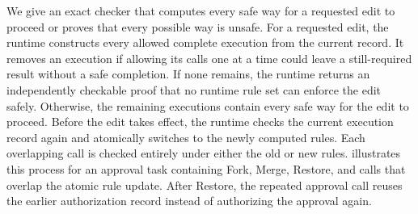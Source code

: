 We give an exact checker that computes every safe way for a requested edit to proceed or proves that every possible way is unsafe.
For a requested edit, the runtime constructs every allowed complete execution from the current record.
It removes an execution if allowing its calls one at a time could leave a still-required result without a safe completion.
If none remains, the runtime returns an independently checkable proof that no runtime rule set can enforce the edit safely.
Otherwise, the remaining executions contain every safe way for the edit to proceed.
Before the edit takes effect, the runtime checks the current execution record again and atomically switches to the newly computed rules.
Each overlapping call is checked entirely under either the old or new rules.
 illustrates this process for an approval task containing Fork, Merge, Restore, and calls that overlap the atomic rule update.
After Restore, the repeated approval call reuses the earlier authorization record instead of authorizing the approval again.


